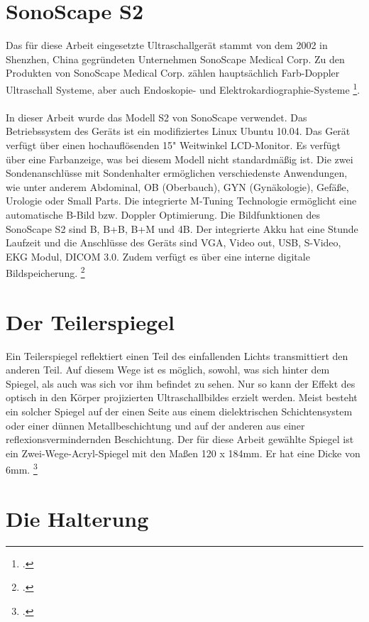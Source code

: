 \section{SonoScape S2}

Das für diese Arbeit eingesetzte Ultraschallgerät stammt von dem 2002 in Shenzhen, China gegründeten Unternehmen SonoScape Medical Corp. Zu den Produkten von SonoScape Medical Corp. zählen hauptsächlich Farb-Doppler Ultraschall Systeme, aber auch Endoskopie- und Elektrokardiographie-Systeme \footcite{SonoScape}.
\\
\\
In dieser Arbeit wurde das Modell S2 von SonoScape verwendet. Das Betriebssystem des Geräts ist ein modifiziertes Linux Ubuntu 10.04. Das Gerät verfügt über einen hochauflösenden 15" Weitwinkel LCD-Monitor. Es verfügt über eine Farbanzeige, was bei diesem Modell nicht standardmäßig ist. Die zwei Sondenanschlüsse mit Sondenhalter ermöglichen verschiedenste Anwendungen, wie unter anderem Abdominal, OB (Oberbauch), GYN (Gynäkologie), Gefäße, Urologie oder Small Parts. Die integrierte M-Tuning Technologie ermöglicht eine automatische B-Bild bzw. Doppler Optimierung. Die Bildfunktionen des SonoScape S2 sind B, B+B, B+M und 4B. Der integrierte Akku hat eine Stunde Laufzeit und die Anschlüsse des Geräts sind VGA, Video out, USB, S-Video, EKG Modul, DICOM 3.0. Zudem verfügt es über eine interne digitale Bildspeicherung. \footcite{SonoScapeS2}

\section{Der Teilerspiegel}

Ein Teilerspiegel reflektiert einen Teil des einfallenden Lichts transmittiert den anderen Teil. Auf diesem Wege ist es möglich, sowohl, was sich hinter dem Spiegel, als auch was sich vor ihm befindet zu sehen. Nur so kann der Effekt des optisch in den Körper projizierten Ultraschallbildes erzielt werden. Meist besteht ein solcher Spiegel auf der einen Seite aus einem dielektrischen Schichtensystem oder einer dünnen Metallbeschichtung und auf der anderen aus einer reflexionsvermindernden Beschichtung. Der für diese Arbeit gewählte Spiegel ist ein Zwei-Wege-Acryl-Spiegel mit den Maßen 120 x 184mm. Er hat eine Dicke von 6mm. \footcite{Teilerspiegel}

\section{Die Halterung} \label{MaterialienHalterung}


